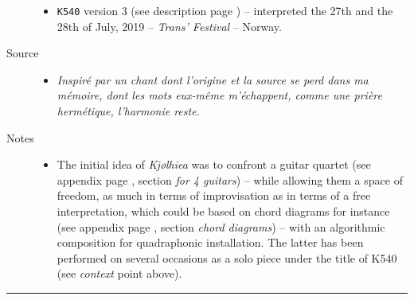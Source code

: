\begin{description}
\begin{itemize}
\item \texttt{K540} version 3 (see description page \pageref{k540v3}) -- interpreted the 27th and the 28th of July, 2019 -- \textit{Trans' Festival}  -- Norway.
\end{itemize}
\item[Source] \hfill 
\begin{itemize}
\item[] \textit{Inspiré par un chant dont l'origine et la source se perd dans ma mémoire, dont les mots eux-même m'échappent, comme une prière hermétique, l'harmonie reste.}
\end{itemize}
\bigskip
\bigskip
\item[Notes] \hfill 
\begin{itemize}
\item[]  The initial idea of \textsl{Kjølhiea} was to confront a guitar quartet (see appendix page \pageref{kjccqg}, section \textsl{for 4 guitars}) -- while allowing them a space of freedom, as much in terms of improvisation as in terms of a free interpretation, which could be based on chord diagrams for instance (see appendix page \pageref{kjcccc}, section \textsl{chord diagrams}) -- with an algorithmic composition for quadraphonic installation. The latter has been performed on several occasions as a solo piece under the title of K540 (see \textsl{context} point above).
\end{itemize}

\end{description}


\bigskip

\begin{center}\rule{0.5\linewidth}{0.5pt}\end{center}

\bigskip

